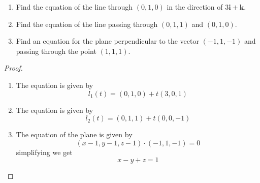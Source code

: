 \documentclass[openany]{book}
\begin{document}
\begin{prob}[4]
    \begin{enumerate}
        \item[(a)] Find the equation of the line through \( (0, 1, 0) \) in the direction of \( 3\mathbf{i} + \mathbf{k} \).  
        \item[(b)] Find the equation of the line passing through \( (0, 1, 1) \) and \( (0, 1, 0) \).  
        \item[(c)] Find an equation for the plane perpendicular to the vector \( (-1, 1, -1) \) and passing through the point \( (1, 1, 1) \).
    \end{enumerate}
\end{prob}
\begin{proof}
    \begin{enumerate}
        \item[(a)] The equation is given by 
        \begin{equation*}
            l_1(t)=(0,1,0)+t(3, 0, 1)
        \end{equation*}
        \item[(b)] The equation is given by 
        \begin{equation*}
            l_2(t)=(0,1,1)+t(0, 0, -1)
        \end{equation*}
        \item[(c)] The equation of the plane is given by 
        \begin{equation*}
            (x-1, y-1, z-1)\cdot (-1, 1, -1)=0
        \end{equation*}
        simplifying we get 
        \begin{equation*}
            x-y+z=1
        \end{equation*}
    \end{enumerate}
\end{proof}
\end{document}
